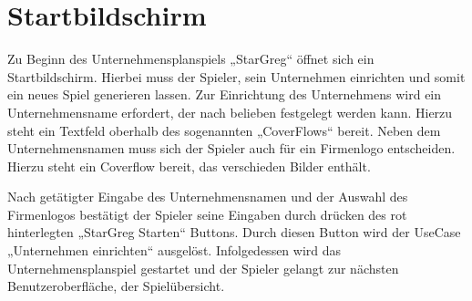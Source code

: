 \section{Startbildschirm}
\label{sec:ui-startbildschirm}

Zu Beginn des Unternehmensplanspiels „StarGreg“ öffnet sich ein Startbildschirm. Hierbei muss der Spieler, sein Unternehmen einrichten und somit ein neues Spiel generieren lassen. Zur Einrichtung des Unternehmens wird ein Unternehmensname erfordert, der nach belieben festgelegt werden kann. Hierzu steht ein Textfeld oberhalb des sogenannten „CoverFlows“ bereit. Neben dem Unternehmensnamen muss sich der Spieler auch für ein Firmenlogo entscheiden. Hierzu steht ein Coverflow bereit, das verschieden Bilder enthält.
 
Nach getätigter Eingabe des Unternehmensnamen und der Auswahl des Firmenlogos bestätigt der Spieler seine Eingaben durch drücken des rot hinterlegten „StarGreg Starten“ Buttons. Durch diesen Button wird der UseCase „Unternehmen einrichten“ ausgelöst. Infolgedessen wird das Unternehmensplanspiel gestartet und der Spieler gelangt zur nächsten Benutzeroberfläche, der Spielübersicht.

\autorende{}
 